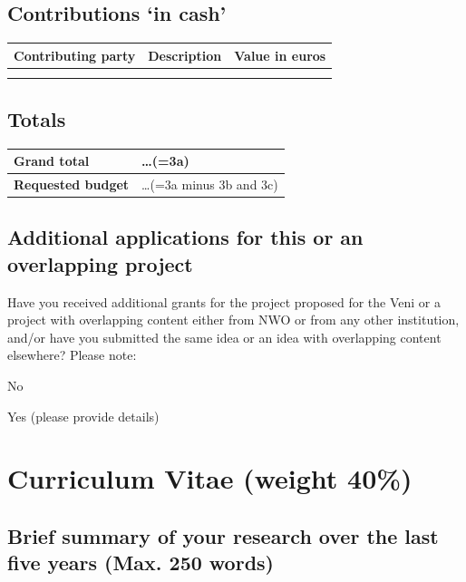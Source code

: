 \documentclass[10pt]{article}
\newcommand{\tableheadfont}{\bfseries\fontsize{10}{10}\selectfont\leavevmode\color{tableblue}}
\begin{document}
	\subsection{Contributions `in cash'}

	{\renewcommand{\arraystretch}{1.5}
	\begin{tabularx}{\linewidth}{|X|X|X|}
		\arrayrulecolor[gray]{0.4}\hline
		\rowcolor[gray]{0.95} {\tableheadfont Contributing party} & {\tableheadfont Description } & {\tableheadfont Value in euros} \\\hline 
		& & \\\hline
		& & \\\hline
	\end{tabularx}
	}
	
	\subsection{Totals}
	{\renewcommand{\arraystretch}{1.5}
	\begin{tabularx}{\linewidth}{|p{5cm}|X|}
		\arrayrulecolor[gray]{0.4}\hline
		{\cellcolor[gray]{0.95}\tableheadfont Grand total} & \ldots\quad (=3a) \\\hline 
		{\cellcolor[gray]{0.95}\tableheadfont Requested budget} & \ldots\quad (=3a minus 3b and 3c) \\\hline 
	\end{tabularx}
	}

	\subsection{Additional applications for this or an overlapping project}
	Have you received additional grants for the project proposed for the Veni or a project with overlapping content either from NWO or from any other institution, and/or have you submitted the same idea or an idea with overlapping content elsewhere?
	Please note:
	\begin{todolist}
		\setlength\itemsep{0em}
	    \item No
	    \item Yes (please provide details)
	\end{todolist}
    \vfill
	

	\section{Curriculum Vitae (weight 40\%)}
	\subsection{Brief summary of your research over the last five years (Max. 250 words)}
	\vfill
	
\end{document}
